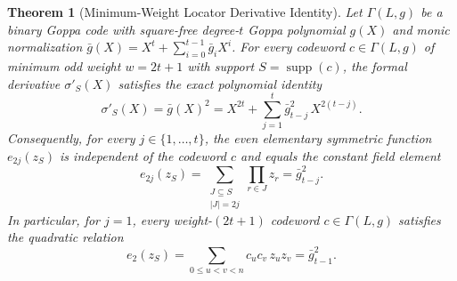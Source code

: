 \documentclass[11pt,a4paper]{article}
\newtheorem{theorem}{Theorem}
\theoremstyle{definition}
\theoremstyle{remark}
\newcommand{\supp}{\operatorname{supp}}
\begin{document}
\begin{theorem}[Minimum-Weight Locator Derivative Identity]
\label{thm:deriv-square}
Let $\Gamma(L, g)$ be a binary Goppa code with square-free degree-$t$ Goppa polynomial $g(X)$ and monic normalization $\bar{g}(X) = X^t + \sum_{i=0}^{t-1} \bar{g}_i X^i$. For every codeword $c \in \Gamma(L, g)$ of minimum odd weight $w = 2t + 1$ with support $S = \supp(c)$, the formal derivative $\sigma'_S(X)$ satisfies the exact polynomial identity
\begin{equation}
\label{eq:deriv-square}
    \sigma'_S(X) = \bar{g}(X)^2 = X^{2t} + \sum_{j=1}^t \bar{g}_{t-j}^2\, X^{2(t-j)}.
\end{equation}
Consequently, for every $j \in \{1, \dots, t\}$, the even elementary symmetric function $e_{2j}(z_S)$ is independent of the codeword $c$ and equals the constant field element
\begin{equation}
\label{eq:even-esf}
    e_{2j}(z_S) = \sum_{\substack{J \subseteq S \\ |J| = 2j}} \prod_{r \in J} z_r = \bar{g}_{t-j}^2.
\end{equation}
In particular, for $j = 1$, every weight-$(2t+1)$ codeword $c \in \Gamma(L, g)$ satisfies the quadratic relation
\begin{equation}
\label{eq:e2-quadratic}
    e_2(z_S) = \sum_{0 \le u < v < n} c_u c_v\, z_u z_v = \bar{g}_{t-1}^2.
\end{equation}
\end{theorem}
\end{document}
